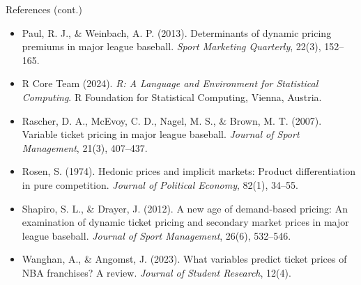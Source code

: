 \documentclass{beamer}
\begin{document}
\begin{frame}{References (cont.)}
\tiny
\begin{itemize}
  \item Paul, R. J., \& Weinbach, A. P. (2013). Determinants of dynamic pricing premiums in major league baseball. \textit{Sport Marketing Quarterly}, 22(3), 152--165.

  \item R Core Team (2024). \textit{R: A Language and Environment for Statistical Computing}. R Foundation for Statistical Computing, Vienna, Austria.

  \item Rascher, D. A., McEvoy, C. D., Nagel, M. S., \& Brown, M. T. (2007). Variable ticket pricing in major league baseball. \textit{Journal of Sport Management}, 21(3), 407--437.

  \item Rosen, S. (1974). Hedonic prices and implicit markets: Product differentiation in pure competition. \textit{Journal of Political Economy}, 82(1), 34--55.

  \item Shapiro, S. L., \& Drayer, J. (2012). A new age of demand-based pricing: An examination of dynamic ticket pricing and secondary market prices in major league baseball. \textit{Journal of Sport Management}, 26(6), 532--546.

  \item Wanghan, A., \& Angomst, J. (2023). What variables predict ticket prices of NBA franchises? A review. \textit{Journal of Student Research}, 12(4).
\end{itemize}
\end{frame}
\end{document}
